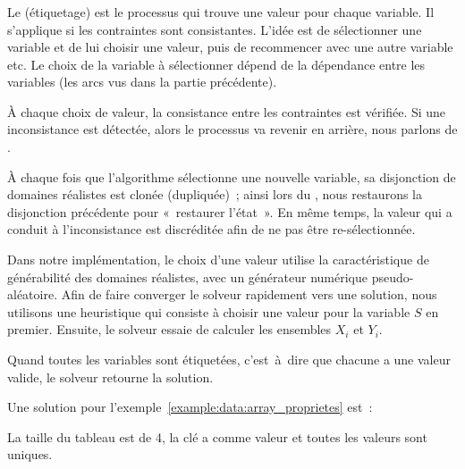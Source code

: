 \subsubsection{}

Le  (étiquetage) est le processus qui trouve une valeur
pour chaque variable. Il s'applique si les contraintes sont consistantes. L'idée
est de sélectionner une variable et de lui choisir une valeur, puis de
recommencer avec une autre variable etc. Le choix de la variable à sélectionner
dépend de la dépendance entre les variables (les arcs vus dans la partie
précédente).

À chaque choix de valeur, la consistance entre les contraintes est vérifiée. Si
une inconsistance est détectée, alors le processus va revenir en arrière, nous
parlons de .

À chaque fois que l'algorithme sélectionne une nouvelle variable, sa disjonction
de domaines réalistes est clonée (dupliquée)~; ainsi lors du
, nous restaurons la disjonction précédente pour
«~restaurer l'état~». En même temps, la valeur qui a conduit à l'inconsistance
est discréditée afin de ne pas être re-sélectionnée.

Dans notre implémentation, le choix d'une valeur utilise la caractéristique de
générabilité des domaines réalistes, avec un générateur numérique
pseudo-aléatoire. Afin de faire converger le solveur rapidement vers une
solution, nous utilisons une heuristique qui consiste à choisir une valeur pour
la variable $S$ en premier. Ensuite, le solveur essaie de calculer les ensembles
$X_i$ et $Y_i$.

Quand toutes les variables sont étiquetées, c'est~à~dire que chacune a une
valeur valide, le solveur retourne la solution.

\begin{example}

Une solution pour l'exemple~\ref{example:data:array_proprietes} est~:
%
\begin{pre}
[ \\
    0 => 'c', \\
    1 => 'd', \\
    2 => 'a', \\
    3 => 'e' \\
]
\end{pre}
%
La taille du tableau est de 4, la clé  a comme valeur  et
toutes les valeurs sont uniques.

\end{example}
